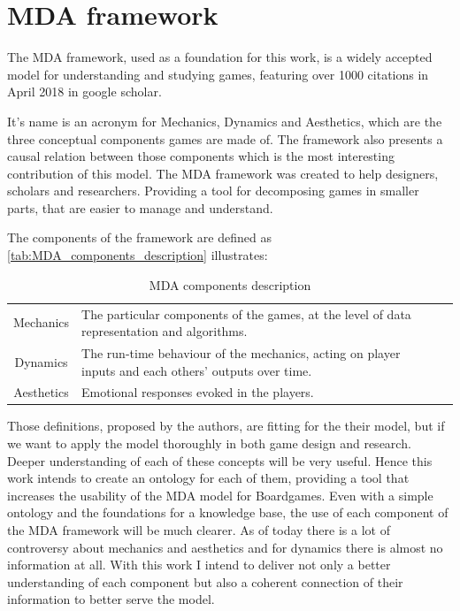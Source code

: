 \section{MDA framework}

The MDA framework, used as a foundation for this work, is a widely accepted model for understanding and studying games, featuring over 1000 citations in April 2018 in google scholar. 

It's name is an acronym for Mechanics, Dynamics and Aesthetics, which are the three conceptual components games are made of. The framework also presents a causal relation between those components which is the most interesting contribution of this model. The MDA framework was created to help designers, scholars and researchers. Providing a tool for decomposing games in smaller parts, that are easier to manage and understand. 

The components of the framework are defined as \autoref{tab:MDA_components_description} illustrates:
{\renewcommand{\arraystretch}{1.5}
\begin{table}[!h]
    \caption{MDA components description \citep{Hunicke2004}}
    \vspace{.5em}
    \centering
    \begin{tabular}{c|m{6cm}l|}
    Mechanics &  The particular components of the games, at the level of data representation and algorithms.\\ \cline{1-2}
    Dynamics & The run-time behaviour of the mechanics, acting on player inputs and each others' outputs over time.\\ \cline{1-2} 
    Aesthetics & Emotional responses evoked in the players.\\
    \end{tabular}
    \label{tab:MDA_components_description}
\end{table}}


Those definitions, proposed by the authors, are fitting for the their model, but if we want to apply the model thoroughly in both game design and research. Deeper understanding of each of these concepts will be very useful. Hence this work intends to create an ontology for each of them, providing a tool that increases the usability of the MDA model for Boardgames. Even with a simple ontology and the foundations for a knowledge base, the use of each component of the MDA framework will be much clearer. As of today there is a lot of controversy about mechanics and aesthetics and for dynamics there is almost no information at all. With this work I intend to deliver not only a better  understanding of each component but also a coherent connection of their information to better serve the model.

